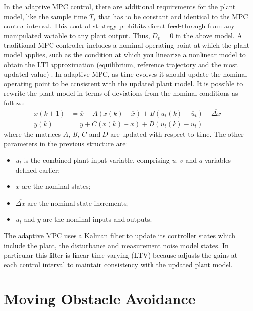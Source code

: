 \documentclass[conference,11pt]{IEEEtran}
\renewcommand{\vec}[1]{\ensuremath{\boldsymbol{\mathit{#1}}}}
\begin{document}
In the adaptive MPC control, there are additional requirements for the plant model, like the sample time $T_s$ that has to be constant and identical to the MPC control interval. This control strategy prohibits direct feed-through from any manipulated variable to any plant output. Thus, $\vec{D_v} = \vec{0}$ in the above model.
A traditional MPC controller includes a nominal operating point at which the plant model applies, such as the condition at which you linearize a nonlinear model to obtain the LTI approximation (equilibrium, reference trajectory and the	
most updated value) \cite{mpctoolbox}. In adaptive MPC, as time evolves it should update the nominal operating point to be consistent with the updated plant model. It is possible to rewrite the plant model in terms of deviations from the nominal conditions as follows:
\begin{equation*}
\label{eqn:Adaptive_MPC_nominal_condition}
\begin{aligned}
\vec{x}(k+1)&=\overline{\vec{x}}+\vec{A}(\vec{x}(k)-\overline{\vec{x}})+ \vec{B}(\vec{u}_t(k)-\overline{\vec{u}}_t)+\overline{\Delta \vec{x}} \\
\vec{y}(k)&=\overline{\vec{y}}+\vec{C}(\vec{x}(k)-\overline{\vec{x}}) + \vec{D}(\vec{u}_t(k)-\overline{\vec{u}}_t)
\end{aligned}
\end{equation*}
where the matrices \vec{A}, \vec{B}, \vec{C} and \vec{D} are updated with respect to time. The other parameters in the previous structure are:
\begin{itemize}
	\item $\vec{u}_t$ is the combined plant input variable, comprising $\vec{u}$, $\vec{v}$ and $\vec{d}$ variables defined earlier;
	\item $\overline{\vec{x}}$ are the nominal states;
	\item $\overline{\Delta \vec{x}}$ are the nominal state increments;
	\item $\overline{\vec{u}_t}$ and $\overline{\vec{y}}$ are the nominal inputs and outputs.
\end{itemize} 
The adaptive MPC uses a Kalman filter to update its controller states which include the plant, the disturbance and measurement noise model states. In particular this filter is linear-time-varying (LTV) because adjusts the gains at each control
interval to maintain consistency with the updated plant model.
\section{Moving Obstacle Avoidance}
\end{document}
